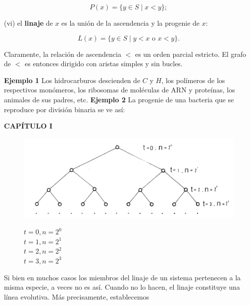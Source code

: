 {\[P(x) = \{y \in S \mid x < y\};\]

(vi) el \textbf{linaje} de \( x \) es la unión de la ascendencia y la progenie de \( x \):

\[L(x) = \{y \in S \mid y < x \text{ o } x < y\}.\]

Claramente, la relación de ascendencia \( < \) es un orden parcial estricto. El grafo de \( < \) es entonces dirigido con aristas simples y sin bucles.

\textbf{Ejemplo 1} Los hidrocarburos descienden de \( C \) y \( H \), los polímeros de los respectivos monómeros, los ribosomas de moléculas de ARN y proteínas, los animales de sus padres, etc. \textbf{Ejemplo 2} La progenie de una bacteria que se reproduce por división binaria se ve así:
}

\newpage
\fancyhf{}
\fancyhead[l]{\thepage}
\begin{center}
{\fontsize{13}{16}\selectfont \textbf{CAPÍTULO I}}
\end{center}
\vspace{0.5cm}

\begin{figure}[h!]
    \begin{minipage}{0.5\textwidth}
        \includegraphics[width=\linewidth]{imagenes/pag.34.png}
    \end{minipage}%
    \hfill
    \begin{minipage}{0.4\textwidth}
        \raggedleft
        \fontsize{13}{15}\selectfont
        $t = 0, n = 2^0$ \\[1em]
        $t = 1, n = 2^1$ \\[1em]
        $t = 2, n = 2^2$ \\[1em]
        $t = 3, n = 2^3$
    \end{minipage}
\end{figure}

Si bien en muchos casos los miembros del linaje de un sistema pertenecen a la misma especie, a veces no es así. Cuando no lo hacen, el linaje constituye una línea evolutiva. Más precisamente, establecemos \\

